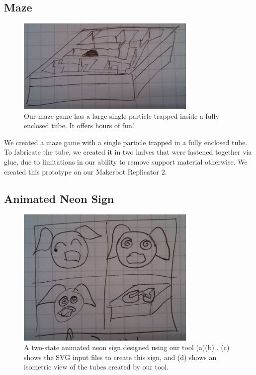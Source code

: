 \subsection{Maze}

\begin{figure}[h]
\centering
    \includegraphics[width=3.4in]{figures/placeholder/maze.jpg}
\caption{Our maze game has a large single particle trapped inside a fully enclosed tube.  It offers hours of fun!}
\label{fig:maze}
\end{figure}

We created a maze game with a single particle trapped in a fully enclosed tube.  To fabricate the tube, we created it in two halves that were fastened together via glue, due to limitations in our ability to remove support material otherwise.  We created this prototype on our Makerbot Replicator 2.

\subsection{Animated Neon Sign}

\begin{figure}[h]
\centering
    \includegraphics[width=3.4in]{figures/placeholder/sign.jpg}
\caption{A two-state animated neon sign designed using our tool (a)(b) .  (c) shows the SVG input files to create this sign, and (d) shows an isometric view of the tubes created by our tool. }
\label{fig:neon}
\end{figure}

